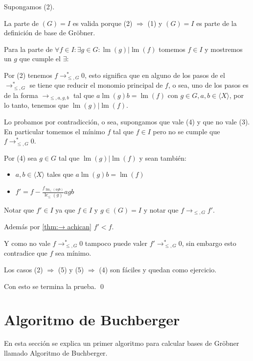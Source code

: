 \documentclass[12pt]{report}
\theoremstyle{customstyle}
\renewenvironment{proof}[1][\proofname]{{\bfseries #1: }}{\qed} %
\theoremstyle{factstyle}
\DeclareMathOperator{\lm}{lm}
\DeclareMathOperator{\lc}{lc}
\begin{document}
\begin{proof}
\begin{description}
    \item[(2) $⇒$ (4)] Supongamos (2).

    La parte de $(G) = I$ es valida porque (2) $⇒$ (1) y $(G) = I$ es parte de la definición de base de Gröbner.

    Para la parte de $∀f ∈ I : ∃g ∈ G : \lm(g) | \lm(f)$ tomemos $f ∈ I$ y mostremos un $g$ que cumple el $∃$:

    Por (2) tenemos $f →^*_{≤, G} 0$, esto significa que en alguno de los pasos de el $→^*_{≤, G}$ se tiene que reducir el monomio principal de $f$, o sea, uno de los pasos es de la forma $→_{≤, a, g, b}$ tal que $a \lm(g) b = \lm(f)$ con $g ∈ G, a, b ∈ ⟨X⟩$, por lo tanto, tenemos que $\lm(g) | \lm(f)$.

    \item[(4) $⇒$ (3)] Lo probamos por contradicción, o sea, supongamos que vale (4) y que no vale (3). En particular tomemos el mínimo $f$ tal que $f ∈ I$ pero no se cumple que $f →^*_{≤, G} 0$.

    Por (4) sea $g ∈ G$ tal que $\lm(g) | \lm(f)$ y sean también:
    \begin{itemize}
      \item $a, b ∈ ⟨X⟩$ tales que $a \lm(g) b = \lm(f)$
      \item $f' = f - \frac{f_{\lm_≤(agb)}}{\lc_≤(g)}agb$
    \end{itemize}

    Notar que $f' ∈ I$ ya que $f ∈ I$ y $g ∈ (G) = I$ y notar que $f →_{≤, G} f'$.

    Además por \cref{thm:→ achican} $f' < f$.

    Y como no vale $f →^*_{≤, G} 0$ tampoco puede valer $f' →^*_{≤, G} 0$, sin embargo esto contradice que $f$ sea mínimo.

    \item Los casos (2) $⇒$ (5) y (5) $⇒$ (4) son fáciles y quedan como ejercicio. %

  \end{description}
  Con esto se termina la prueba.
\end{proof}


\section{Algoritmo de Buchberger}

En esta sección se explica un primer algoritmo para calcular bases de Gröbner llamado Algoritmo de Buchberger.
\end{document}
